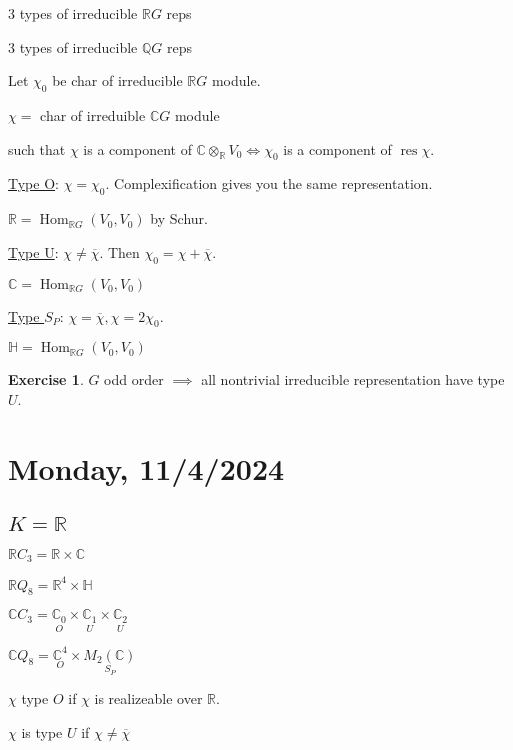 \documentclass{article}
\theoremstyle{definition}
\newtheorem*{exercise}{Exercise}
\begin{document}
3 types of irreducible \(\mathbb{R}G\) reps

3 types of irreducible \(\mathbb{Q} G\) reps

Let \(\chi_0\) be char of irreducible \(\mathbb{R}G\) module.

\(\chi =\) char of irreduible \(\mathbb{C} G\) module

such that \(\chi\) is a component of \(\mathbb{C} \otimes_\mathbb{R} V_0 \iff \chi_0\) is a component of \(\operatorname{res} \chi\).

\underline{Type O}: \(\chi = \chi_0\). Complexification gives you the same representation.

\(\mathbb{R} = \operatorname{Hom}_{\mathbb{R} G}(V_0, V_0)\) by Schur.

\underline{Type U}: \(\chi \neq \overline{\chi}\). Then \(\chi_0 = \chi + \overline{\chi}\).

\(\mathbb{C} = \operatorname{Hom}_{\mathbb{R} G}(V_0, V_0)\)

\underline{Type \(S_P\)}: \(\chi = \overline{\chi}, \chi = 2 \chi_0\).

\(\mathbb{H} = \operatorname{Hom}_{\mathbb{R} G}(V_0, V_0)\) 

\begin{exercise}
    \(G\) odd order \(\implies\) all nontrivial irreducible representation have type \(U\).
\end{exercise}

\section*{Monday, 11/4/2024}

\subsection*{\(K = \mathbb{R}\)}

\(\mathbb{R} C_3 = \mathbb{R} \times \mathbb{C}\) 

\(\mathbb{R} Q_8 = \mathbb{R}^4 \times \mathbb{H}\)

\(\mathbb{C} C_3 = \underset{O}{\mathbb{C}_0} \times \underset{U}{\mathbb{C}_1} \times \underset{U}{\mathbb{C}_2} \) 

\(\mathbb{C} Q_8 = \underset{O}{\mathbb{C}^4}  \times \underset{S_P}{M_2(\mathbb{C})}\)

\(\chi\) type \(O\) if \(\chi\) is realizeable over \(\mathbb{R}\).

\(\chi\) is type \(U\) if \(\chi \neq \overline{\chi}\) 
\end{document}
